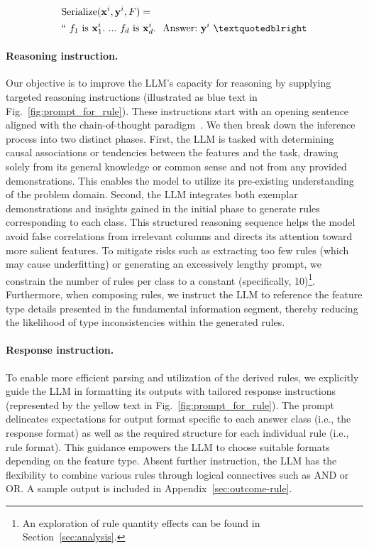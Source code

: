 \begin{align}
&\text{Serialize}(\mathbf{x}^i,\mathbf{y}^i, F) = \nonumber \\ 
&``\ f_1\ \text{is}\ \mathbf{x}^i_1.\ ... \ f_d\  \text{is}\  \mathbf{x}^i_d.\ \ \text{Answer:}\  \mathbf{y}^i\ ”
\end{align}

\vspace*{-0.12in}
\paragraph{Reasoning instruction.} Our objective is to improve the LLM's capacity for reasoning by supplying targeted reasoning instructions (illustrated as blue text in Fig.~\ref{fig:prompt_for_rule}). These instructions start with an opening sentence aligned with the chain-of-thought paradigm~\cite{wei2022chain}. We then break down the inference process into two distinct phases. First, the LLM is tasked with determining causal associations or tendencies between the features and the task, drawing solely from its general knowledge or common sense and not from any provided demonstrations. This enables the model to utilize its pre-existing understanding of the problem domain. Second, the LLM integrates both exemplar demonstrations and insights gained in the initial phase to generate rules corresponding to each class. This structured reasoning sequence helps the model avoid false correlations from irrelevant columns and directs its attention toward more salient features. To mitigate risks such as extracting too few rules (which may cause underfitting) or generating an excessively lengthy prompt, we constrain the number of rules per class to a constant (specifically, 10)\footnote{An exploration of rule quantity effects can be found in Section~\ref{sec:analysis}.}. Furthermore, when composing rules, we instruct the LLM to reference the feature type details presented in the fundamental information segment, thereby reducing the likelihood of type inconsistencies within the generated rules.

\vspace*{-0.12in}
\paragraph{Response instruction.} To enable more efficient parsing and utilization of the derived rules, we explicitly guide the LLM in formatting its outputs with tailored response instructions (represented by the yellow text in Fig.~\ref{fig:prompt_for_rule}). The prompt delineates expectations for output format specific to each answer class (i.e., the response format) as well as the required structure for each individual rule (i.e., rule format). This guidance empowers the LLM to choose suitable formats depending on the feature type. Absent further instruction, the LLM has the flexibility to combine various rules through logical connectives such as AND or OR. A sample output is included in Appendix~\ref{sec:outcome-rule}.

